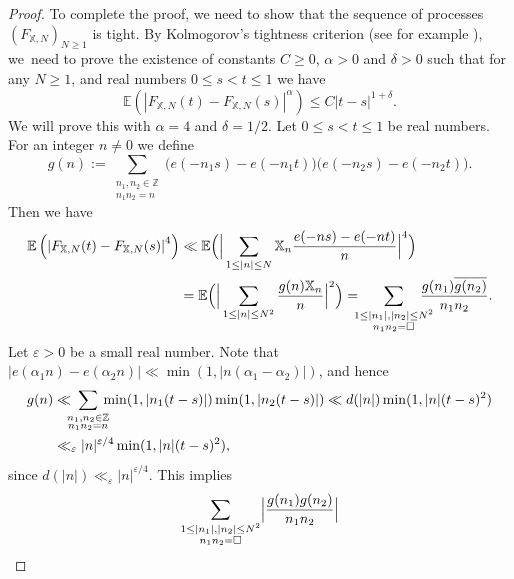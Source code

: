 \documentclass[10pt]{amsart}
\theoremstyle{plain}
\theoremstyle{definition}
\let\ep\varepsilon
\newcommand{\X}{\mathbb{X}}
\newcommand{\ex}{\mathbb{E}}
\begin{document}
\begin{proof}
To complete the proof, we need to show that the sequence of processes $(F_{\X, N})_{N\geq 1}$ is tight. By Kolmogorov's tightness criterion (see for example \cite[Prop.\,B.11.10]{Ko}), we~need to prove the existence of constants $C\geq 0$, $\alpha>0$ and $\delta>0$ such that for any $N\geq 1$, and real numbers $0\leq s<t\leq 1$ we have
\[\ex\left(\left|F_{\X, N}(t)-F_{\X, N}(s)\right|^{\alpha}\right)\leq C |t-s|^{1+\delta}.\]
We will prove this with $\alpha=4$ and $\delta= 1/2.$ Let $0\leq s<t\leq 1$ be real numbers. For an integer $n\neq 0$ we define
\begin{equation}\label{Definitiong}
g(n):= \sum_{\substack{n_1, n_2 \in \mathbb{Z}\\ n_1n_2=n}} \big(e(-n_1s)-e(-n_1t)\big)\big(e(-n_2s)-e(-n_2t)\big).
\end{equation}
Then we have
\begin{equation}\label{eq: Bound4thMomentPartialRandom}
\begin{aligned}
\ex\left(\left|F_{\X, N}(t)-F_{\X, N}(s)\right|^{4}\right)&\ll \ex\Big(\Big|\sum_{1\leq |n|\leq N} \X_n \frac{e(-ns)-e(-nt)}{n}\Big|^4\Big)\\
& = \ex\Big(\Big|\sum_{1\leq |n|\leq N^2} \frac{g(n) \X_n }{n}\Big|^2\Big) = \hspace*{-2mm}\sum_{\substack{1\leq |n_1|, |n_2|\leq N^2\\ n_1n_2=\square}}\hspace*{-4mm} \frac{g(n_1)\overline{g(n_2)}}{n_1n_2}.
\end{aligned}
\end{equation}
Let $\ep>0$ be a small real number. Note that $|e(\alpha_1 n)-e(\alpha_2 n)|\ll \min(1, |n(\alpha_1-\alpha_2)|)$, and hence
\begin{equation}\label{EstimateGn}
\begin{aligned}
g(n)&\ll\hspace*{-2mm} \sum_{\substack{n_1, n_2 \in \mathbb{Z}\\ n_1n_2=n}}\hspace*{-2mm} \min(1, |n_1(t-s)|)\min(1, |n_2(t-s)|)\ll d(|n|)\min(1, |n|(t-s)^2)\\
&\ll_{\ep} |n|^{\ep/4}\min(1, |n|(t-s)^2),
\end{aligned}
\end{equation}
since $d(|n|)\ll_{\ep} |n|^{\ep/4}.$
This implies
\begin{align*}
\sum_{\substack{1\leq |n_1|, |n_2|\leq N^2\\ n_1n_2=\square}} \Bigl|\frac{g(n_1)g(n_2)}{n_1n_2}\Bigr|

\end{align*}
\end{proof}
\end{document}
